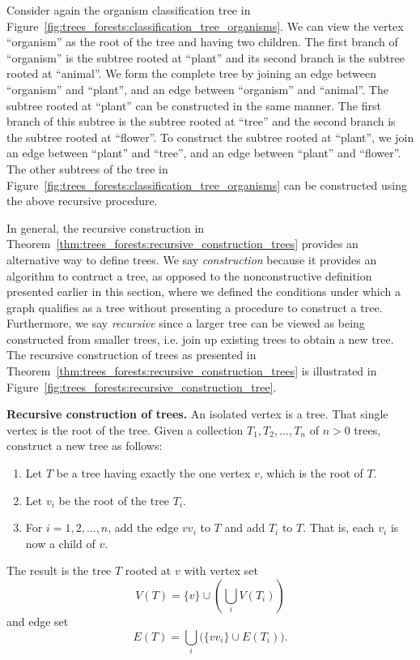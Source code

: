 Consider again the organism classification tree in
Figure~\ref{fig:trees_forests:classification_tree_organisms}. We can
view the vertex ``organism'' as the root of the tree and having two
children. The first branch of ``organism'' is the subtree rooted at
``plant'' and its second branch is the subtree rooted at
``animal''. We form the complete tree by joining an edge between
``organism'' and ``plant'', and an edge between ``organism'' and
``animal''. The subtree rooted at ``plant'' can be constructed in the
same manner. The first branch of this subtree is the subtree rooted at
``tree'' and the second branch is the subtree rooted at ``flower''. To
construct the subtree rooted at ``plant'', we join an edge between
``plant'' and ``tree'', and an edge between ``plant'' and
``flower''. The other subtrees of the tree in
Figure~\ref{fig:trees_forests:classification_tree_organisms} can be
constructed using the above recursive procedure.

In general, the recursive construction in
Theorem~\ref{thm:trees_forests:recursive_construction_trees} provides
an alternative way to define trees. We say \emph{construction} because
it provides an algorithm to contruct a tree, as opposed to the
nonconstructive definition presented earlier in this section, where we
defined the conditions under which a graph qualifies as a tree without
presenting a procedure to construct a tree. Furthermore, we say
\emph{recursive} since a larger tree can be viewed as being
constructed from smaller trees, i.e. join up existing trees to obtain
a new tree. The recursive construction of trees as presented in
Theorem~\ref{thm:trees_forests:recursive_construction_trees} is
illustrated in
Figure~\ref{fig:trees_forests:recursive_construction_tree}.

\begin{theorem}
\label{thm:trees_forests:recursive_construction_trees}
\textbf{Recursive construction of trees.}
An isolated vertex is a tree. That single vertex is the root of the
tree. Given a collection $T_1, T_2, \dots, T_n$ of $n > 0$ trees,
construct a new tree as follows:
\begin{enumerate}
\item Let $T$ be a tree having exactly the one vertex $v$, which is
  the root of $T$.

\item Let $v_i$ be the root of the tree $T_i$.

\item For $i = 1, 2, \dots, n$, add the edge $v v_i$ to $T$ and add
  $T_i$ to $T$. That is, each $v_i$ is now a child of $v$.
\end{enumerate}
The result is the tree $T$ rooted at $v$ with vertex set
\[
V(T)
=
\{v\} \cup \left(\bigcup_i V(T_i)\right)
\]
and edge set
\[
E(T)
=
\bigcup_i \big(\{v v_i\} \cup E(T_i)\big).
\]
\end{theorem}

